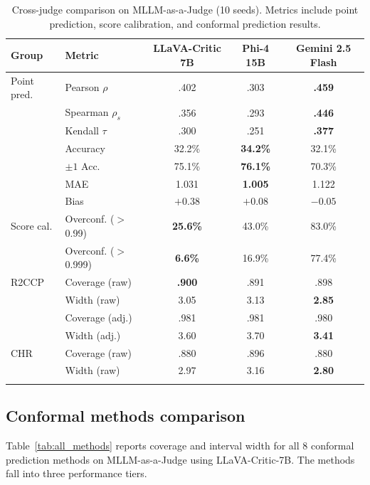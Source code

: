 \documentclass{article}
\begin{document}
\begin{table}[t]
\centering
\caption{Cross-judge comparison on MLLM-as-a-Judge (10 seeds). Metrics include point prediction, score calibration, and conformal prediction results.}
\label{tab:cross_judge}
\small
\begin{tabular}{llccc}
\toprule
\textbf{Group} & \textbf{Metric} & \textbf{LLaVA-Critic 7B} & \textbf{Phi-4 15B} & \textbf{Gemini 2.5 Flash} \\
\midrule

Point pred. & Pearson $\rho$ & .402 & .303 & \textbf{.459} \\
 & Spearman $\rho_s$ & .356 & .293 & \textbf{.446} \\
 & Kendall $\tau$ & .300 & .251 & \textbf{.377} \\
 & Accuracy & 32.2\% & \textbf{34.2\%} & 32.1\% \\
 & $\pm 1$ Acc. & 75.1\% & \textbf{76.1\%} & 70.3\% \\
 & MAE & 1.031 & \textbf{1.005} & 1.122 \\
 & Bias & $+0.38$ & $+0.08$ & $\mathbf{-0.05}$ \\
\midrule
Score cal. & Overconf. ($>$0.99) & \textbf{25.6\%} & 43.0\% & 83.0\% \\
 & Overconf. ($>$0.999) & \textbf{6.6\%} & 16.9\% & 77.4\% \\
\midrule
R2CCP & Coverage (raw) & \textbf{.900} & .891 & .898 \\
 & Width (raw) & 3.05 & 3.13 & \textbf{2.85} \\
 & Coverage (adj.) & .981 & .981 & .980 \\
 & Width (adj.) & 3.60 & 3.70 & \textbf{3.41} \\
\midrule
CHR & Coverage (raw) & .880 & .896 & .880 \\
 & Width (raw) & 2.97 & 3.16 & \textbf{2.80} \\

\bottomrule\vspace{-15pt}
\end{tabular}
\end{table}

\subsection{Conformal methods comparison}
\label{sec:methods_comparison}

Table~\ref{tab:all_methods} reports coverage and interval width for all 8 conformal prediction methods on MLLM-as-a-Judge using LLaVA-Critic-7B. The methods fall into three performance tiers.
\end{document}
